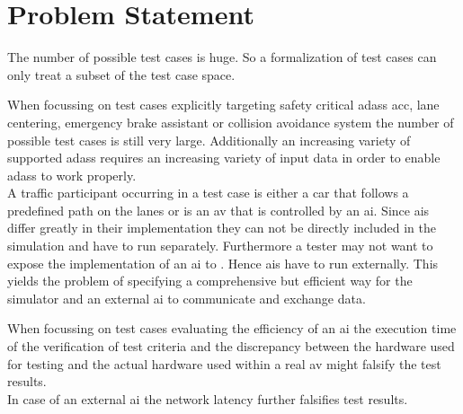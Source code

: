 \section{Problem Statement}\label{sec:problem}
The number of possible test cases is huge.
So a formalization of test cases can only treat a subset of the test case space.\par

When focussing on test cases explicitly targeting safety critical \glspl{adas} \eg{} \gls{acc}, lane centering, emergency brake assistant or collision avoidance system the number of possible test cases is still very large.
Additionally an increasing variety of supported \glspl{adas} requires an increasing variety of input data in order to enable \glspl{adas} to work properly.\\
A traffic participant occurring in a test case is either a car that follows a predefined path on the lanes or is an \gls{av} that is controlled by an \gls{ai}.
Since \glspl{ai} differ greatly in their implementation they can not be directly included in the simulation and have to run separately.
Furthermore a tester may not want to expose the implementation of an \gls{ai} to \drivebuild{}.
Hence \glspl{ai} have to run externally.
This yields the problem of specifying a comprehensive but efficient way for the simulator and an external \gls{ai} to communicate and exchange data.\par

When focussing on test cases evaluating the efficiency of an \gls{ai} the execution time of the verification of test criteria and the discrepancy between the hardware used for testing and the actual hardware used within a real \gls{av} might falsify the test results.\\
In case of an external \gls{ai} the network latency further falsifies test results.\par

